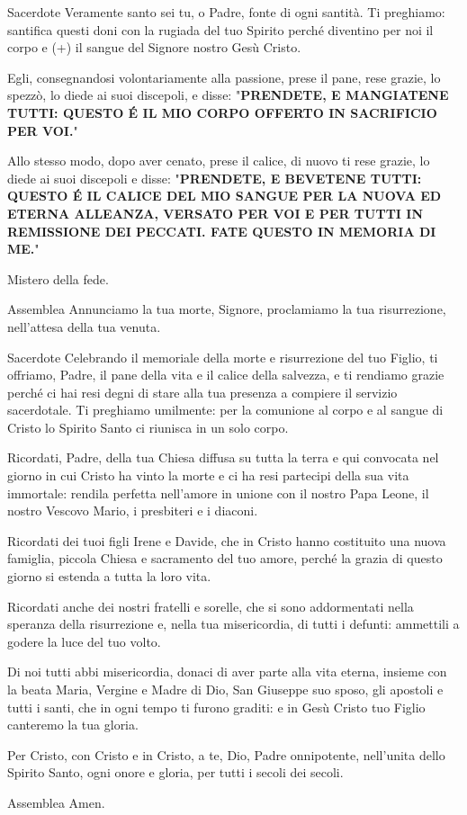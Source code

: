 	\begin{dialoghi}
		\item[Sacerdote] Veramente santo sei tu, o Padre, fonte di ogni santità. Ti preghiamo: santifica questi doni con la rugiada del tuo Spirito perché diventino per noi il corpo e (+) il sangue del Signore nostro Gesù Cristo.

		Egli, consegnandosi volontariamente alla passione, prese il pane, rese grazie, lo spezzò, lo diede ai suoi discepoli, e disse: "\textbf{PRENDETE, E MANGIATENE TUTTI: QUESTO É IL MIO CORPO OFFERTO IN SACRIFICIO PER VOI.}"

		Allo stesso modo, dopo aver cenato, prese il calice, di nuovo ti rese grazie, lo diede ai suoi discepoli e disse: "\textbf{PRENDETE, E BEVETENE TUTTI: QUESTO É IL CALICE DEL MIO SANGUE PER LA NUOVA ED ETERNA ALLEANZA, VERSATO PER VOI E PER TUTTI IN REMISSIONE DEI PECCATI. FATE QUESTO IN MEMORIA DI ME.}"

		Mistero della fede.
		\item[Assemblea] Annunciamo la tua morte, Signore, proclamiamo la tua risurrezione, nell'attesa della tua venuta.
		\item[Sacerdote] Celebrando il memoriale della morte e risurrezione del tuo Figlio, ti offriamo, Padre, il pane della vita e il calice della salvezza, e ti rendiamo grazie perché ci hai resi degni di stare alla tua presenza a compiere il servizio sacerdotale. Ti preghiamo umilmente: per la comunione al corpo e al sangue di Cristo lo Spirito Santo ci riunisca in un solo corpo.

		Ricordati, Padre, della tua Chiesa diffusa su tutta la terra e qui convocata nel giorno in cui Cristo ha vinto la morte e ci ha resi partecipi della sua vita immortale: rendila perfetta nell'amore in unione con il nostro Papa Leone, il nostro Vescovo Mario, i presbiteri e i diaconi.

		Ricordati dei tuoi figli Irene e Davide, che in Cristo hanno costituito una nuova famiglia, piccola Chiesa e sacramento del tuo amore, perché la grazia di questo giorno si estenda a tutta la loro vita.

		Ricordati anche dei nostri fratelli e sorelle, che si sono addormentati nella speranza della risurrezione e, nella tua misericordia, di tutti i defunti: ammettili a godere la luce del tuo volto.

		Di noi tutti abbi misericordia, donaci di aver parte alla vita eterna, insieme con la beata Maria, Vergine e Madre di Dio, San Giuseppe suo sposo, gli apostoli e tutti i santi, che in ogni tempo ti furono graditi: e in Gesù Cristo tuo Figlio canteremo la tua gloria.

		Per Cristo, con Cristo e in Cristo, a te, Dio, Padre onnipotente, nell'unita dello Spirito Santo, ogni onore e gloria, per tutti i secoli dei secoli.
		\item[Assemblea] Amen.
	\end{dialoghi}